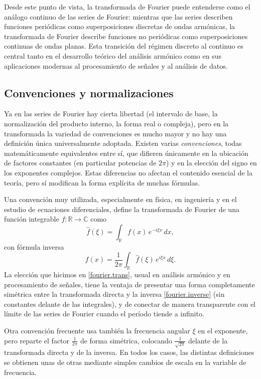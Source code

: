 \documentclass[12pt, a4paper]{amsbook}
\newcommand{\R}{{\mathbb R}}
\newcommand{\C}{{\mathbb C}}
\theoremstyle{remark}
\theoremstyle{definition}
\numberwithin{section}{chapter}
\numberwithin{subsection}{section}
\numberwithin{equation}{section}
\numberwithin{figure}{chapter}
\begin{document}
Desde este punto de vista, la transformada de Fourier puede entenderse como el análogo continuo de las series de Fourier: mientras que las series describen funciones periódicas como superposiciones discretas de ondas armónicas, la transformada de Fourier describe funciones no periódicas como superposiciones continuas de ondas planas. Esta transición del régimen discreto al continuo es central tanto en el desarrollo teórico del análisis armónico como en sus aplicaciones modernas al procesamiento de señales y al análisis de datos.

\subsection{Convenciones y normalizaciones}

Ya en las series de Fourier hay cierta libertad (el intervalo de base, la normalización del producto interno, la forma real o compleja), pero en la transformada la variedad de convenciones es mucho mayor y no hay una definición única universalmente adoptada. Existen varias \emph{convenciones}, todas matemáticamente equivalentes entre sí, que difieren únicamente en la ubicación de factores constantes (en particular potencias de $2\pi$) y en la elección del signo en los exponentes complejos. Estas diferencias no afectan el contenido esencial de la teoría, pero sí modifican la forma explícita de muchas fórmulas.

Una convención muy utilizada, especialmente en física, en ingeniería y en el estudio de ecuaciones diferenciales, define la transformada de Fourier de una función integrable $f:\R\to\C$ como
$$
\hat f(\xi) = \int_{\R} f(x)\, e^{-i \xi x}\, dx,
$$
con fórmula inversa
$$
f(x) = \frac{1}{2\pi}\int_{\R} \hat f(\xi)\, e^{i \xi x}\, d\xi.
$$
La elección que hicimos en \eqref{fourier.trans}, usual en análisis armónico y en procesamiento de señales, tiene la ventaja de presentar una forma completamente simétrica entre la transformada directa y la inversa \eqref{fourier.inverse} (sin constantes delante de las integrales), y de conectar de manera transparente con el límite de las series de Fourier cuando el período tiende a infinito.

Otra convención frecuente usa también la frecuencia angular $\xi$ en el exponente, pero reparte el factor $\frac{1}{2\pi}$ de forma simétrica, colocando $\frac{1}{\sqrt{2\pi}}$ delante de la transformada directa y de la inversa. En todos los casos, las distintas definiciones se obtienen unas de otras mediante simples cambios de escala en la variable de frecuencia.
\end{document}

